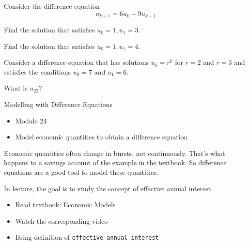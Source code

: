 \question \label{de:de1}
	Consider the difference equation
	$$	u_{k+1} = 6 u_k - 9u_{k-1}	$$
	
\begin{parts}
	\item Find the solution that satisfies $u_0 = 1, u_1 = 3	$.
	\item Find the solution that satisfies $u_0 = 1, u_1 = 4$.
\end{parts}



\bookonlynewpage


\question
	Consider a difference equation that has solutions $u_k = r^k$ for $r=2$ and $r=3$ and satisfies the conditions $u_0 = 7$ and $u_1=6$.
	
	What is $u_{22}$?



\standardonlynewpage

%
%



\begin{module}{Modelling with Difference Equations}
	\label{diff:model}

	
	
\end{module}



\begin{lesson}

	\begin{itemize}
		\item Module 24
	\end{itemize}

	\begin{itemize}
		\item Model economic quantities to obtain a difference equation
	\end{itemize}
	

Economic quantities often change in bursts, not continuously. That's what happens to a savings account of the example in the textbook. So difference equations are a good tool to model these quantities.

In lecture, the goal is to study the concept of effective annual interest.


\begin{itemize}
	\item Read textbook: Economic Models
	\item Watch the corresponding video
	\item Bring definition of {\tt effective annual interest}
\end{itemize}

\end{lesson}



